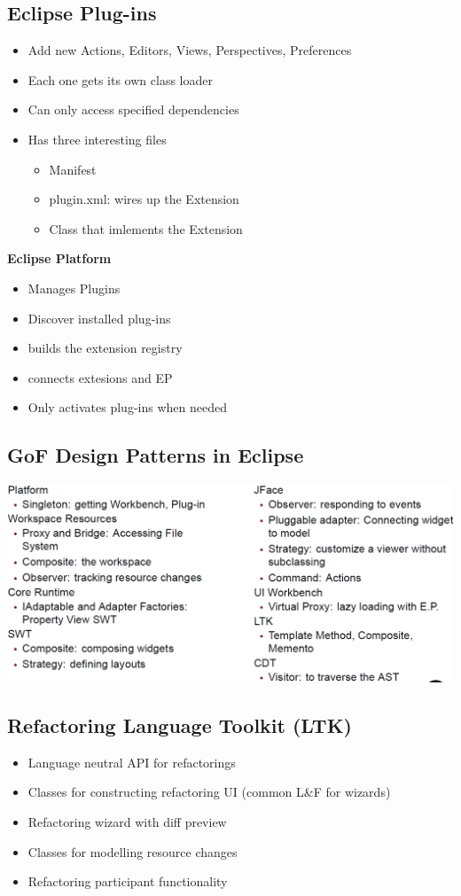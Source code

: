 \subsection{Eclipse Plug-ins}
\begin{itemize}
    \item Add new Actions, Editors, Views, Perspectives, Preferences
    \item Each one gets its own class loader
    \item Can only access specified dependencies
    \item Has three interesting files
    \begin{itemize}
        \item Manifest
        \item plugin.xml: wires up the Extension
        \item Class that imlements the Extension
    \end{itemize}
\end{itemize}
\textbf{Eclipse Platform}
\begin{itemize}
    \item Manages Plugins
    \item Discover installed plug-ins
    \item builds the extension registry
    \item connects extesions and EP
    \item Only activates plug-ins when needed
\end{itemize}

\subsection{GoF Design Patterns in Eclipse}
\includegraphics[width=\linewidth]{./img/eclipse_gof.png}

\subsection{Refactoring Language Toolkit (LTK)}
\begin{itemize}
    \item Language neutral API for refactorings
    \item Classes for constructing refactoring UI (common L\&F for wizards)
    \item Refactoring wizard with diff preview
    \item Classes for modelling resource changes
    \item Refactoring participant functionality
\end{itemize}
